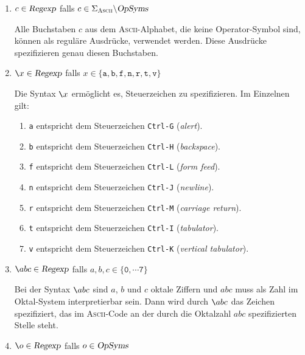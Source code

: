 \begin{enumerate}
\item $c \in \textsl{Regexp}$ \quad falls $c \in \Sigma_{\textsc{\scriptsize Ascii}} \backslash \textsl{OpSyms}$

      Alle Buchstaben $c$ aus dem \textsc{Ascii}-Alphabet, die keine Operator-Symbol sind, k\"onnen
      als regul\"are Ausdr\"ucke, verwendet werden.  Diese Ausdr\"ucke spezifizieren genau diesen Buchstaben.
      
\item $\texttt{\symbol{92}}x \in \textsl{Regexp}$ \quad 
      falls $x \in \{ \texttt{a}, \texttt{b}, \texttt{f}, \texttt{n}, \texttt{r}, \texttt{t}, \texttt{v} \}$ 

      Die Syntax $\texttt{\symbol{92}}x$ erm\"oglicht es, Steuerzeichen 
      zu spezifizieren.  Im Einzelnen gilt:
      \begin{enumerate}
      \item \texttt{a} entspricht dem Steuerzeichen \texttt{Ctrl-G} (\emph{alert}).
      \item \texttt{b} entspricht dem Steuerzeichen \texttt{Ctrl-H} (\emph{backspace}).
      \item \texttt{f} entspricht dem Steuerzeichen \texttt{Ctrl-L} (\emph{form feed}).
      \item \texttt{n} entspricht dem Steuerzeichen \texttt{Ctrl-J} (\emph{newline}).
      \item \texttt{r} entspricht dem Steuerzeichen \texttt{Ctrl-M} (\emph{carriage return}).
      \item \texttt{t} entspricht dem Steuerzeichen \texttt{Ctrl-I} (\emph{tabulator}).
      \item \texttt{v} entspricht dem Steuerzeichen \texttt{Ctrl-K} (\emph{vertical tabulator}).
      \end{enumerate}
\item $\texttt{\symbol{92}}abc \in \textsl{Regexp}$ \quad 
      falls $a,b,c \in \{ \texttt{0}, \cdots \texttt{7} \}$ 

      Bei der Syntax $\texttt{\symbol{92}}abc$ sind $a$, $b$ und $c$ oktale Ziffern und $abc$
      muss als Zahl im Oktal-System interpretierbar sein.
      Dann wird durch  $\texttt{\symbol{92}}abc$ das Zeichen spezifiziert, das im
      \textsc{Ascii}-Code an der durch die Oktalzahl $abc$ spezifizierten Stelle steht.
\item $\texttt{\symbol{92}}o \in \textsl{Regexp}$ \quad falls $o \in \textsl{OpSyms}$ 
      

\end{enumerate}

